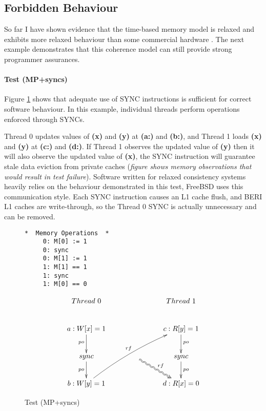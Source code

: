 \clearpage
		\subsection{Forbidden Behaviour} 
		So far I have shown evidence that the time-based memory model is relaxed and exhibits more relaxed behaviour than some commercial hardware \cite{Maranget12}. The next example demonstrates that this coherence model can still provide strong programmer assurances.

\paragraph{Test (MP+syncs)}
		Figure \ref{mp_sync_diagram} shows that adequate use of SYNC instructions is sufficient for correct software behaviour. In this example, individual threads perform operations enforced through SYNCs. 
		
		Thread 0 updates values of \textbf{(x)} and \textbf{(y)} at \textbf{(a:)} and \textbf{(b:)}, and Thread 1 loads \textbf{(x)} and \textbf{(y)} at \textbf{(c:)} and \textbf{(d:)}. If Thread 1 observes the updated value of \textbf{(y)} then it will also observe the updated value of \textbf{(x)}, the SYNC instruction will guarantee stale data eviction from private caches (\textit{figure shows memory observations that would result in test failure}). 
		Software written for relaxed consistency systems heavily relies on the behaviour demonstrated in this test, FreeBSD uses this communication style. 
		Each SYNC instruction causes an L1 cache flush, and BERI L1 caches are write-through, so the Thread 0 SYNC is actually unnecessary and can be removed.
		
\begin{figure}[!h]
\begin{tcolorbox}[
colback=red!1!white,
colframe=red!85!black]
\begin{center}
\begin{BVerbatim}
*  Memory Operations  *
     0: M[0] := 1
     0: sync
     0: M[1] := 1
     1: M[1] == 1
     1: sync
     1: M[0] == 0
\end{BVerbatim}
\end{center}

\vspace{2mm}

\begin{displaymath}
	\xymatrix{
		Thread \ 0 & \ \ \ \ \ \  & Thread \ 1 \\
		a: W[x] = 1 \ar[d]_{po} & & c: R[y] = 1 \ar[d]^{po} \\
		sync \ar[d]_{po} & \ \ \ \ar@2{~>}[dr]^{rf} & sync \ar[d]^{po} \\
		b: W[y] = 1 \ar@/^/@{->}[uurr]^{rf} & & d: R[x] = 0
	}
\end{displaymath}
\end{tcolorbox}
\caption{Test (MP+syncs)}
\label{mp_sync_diagram}
\end{figure}



